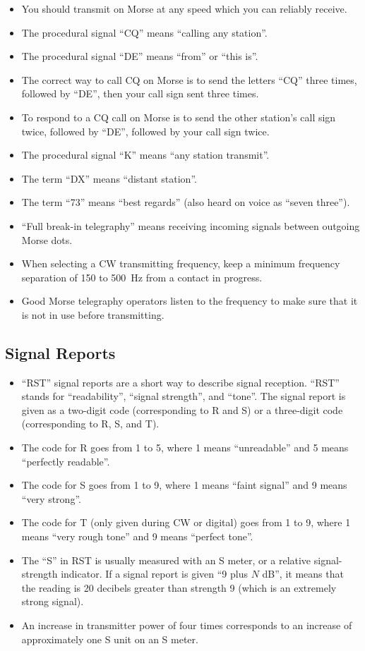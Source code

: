 \documentclass[letterpaper,12pt]{scrartcl}
\begin{document}
\begin{itemize}
\item You should transmit on Morse at any speed which you can reliably receive.
\item The procedural signal ``CQ'' means ``calling any station''.
\item The procedural signal ``DE'' means ``from'' or ``this is''.
\item The correct way to call CQ on Morse is to send the letters ``CQ'' three times, followed by ``DE'', then your call sign sent three times.
\item To respond to a CQ call on Morse is to send the other station's call sign twice, followed by ``DE'', followed by your call sign twice.
\item The procedural signal ``K'' means ``any station transmit''.
\item The term ``DX'' means ``distant station''.
\item The term ``73'' means ``best regards'' (also heard on voice as ``seven three'').
\item ``Full break-in telegraphy'' means receiving incoming signals between outgoing Morse dots.
\item When selecting a CW transmitting frequency, keep a minimum frequency separation of 150 to 500~Hz from a contact in progress.
\item Good Morse telegraphy operators listen to the frequency to make sure that it is not in use before transmitting.
\end{itemize}

\subsection{Signal Reports}

\begin{itemize}
\item ``RST'' signal reports are a short way to describe signal reception.
``RST'' stands for ``readability'', ``signal strength'', and ``tone''.
The signal report is given as a two-digit code (corresponding to R and S)
or a three-digit code (corresponding to R, S, and T).
\item The code for R goes from 1 to 5, where 1 means ``unreadable'' and 5 means ``perfectly readable''.
\item The code for S goes from 1 to 9, where 1 means ``faint signal'' and 9 means ``very strong''.
\item The code for T (only given during CW or digital) goes from 1 to 9, where 1 means ``very rough tone'' and 9 means ``perfect tone''.
\item The ``S'' in RST is usually measured with an S meter, or a relative signal-strength indicator.
If a signal report is given ``9 plus $N$ dB'', it means that the reading is 20 decibels greater than strength 9 (which is an extremely strong signal).
\item An increase in transmitter power of four times corresponds to an increase of approximately one S unit on an S meter.
\end{itemize}
\end{document}
